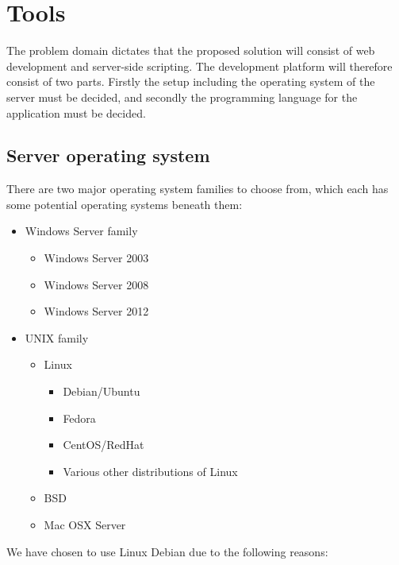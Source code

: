 \section{Tools}
The problem domain dictates that the proposed solution will consist of web development and server-side scripting.
The development platform will therefore consist of two parts.
Firstly the setup including the operating system of the server must be decided, and secondly the programming language for the application must be decided.

\subsection{Server operating system}
There are two major operating system families to choose from, which each has some potential operating systems beneath them:

\begin{itemize}
    \item Windows Server family
        \begin{itemize}
            \item Windows Server 2003
            \item Windows Server 2008
            \item Windows Server 2012
        \end{itemize}
    \item UNIX family
        \begin{itemize}
            \item Linux
                \begin{itemize}
                    \item Debian/Ubuntu
                    \item Fedora
                    \item CentOS/RedHat
                    \item Various other distributions of Linux
                \end{itemize}
            \item BSD
            \item Mac OSX Server
        \end{itemize}
\end{itemize}

We have chosen to use Linux Debian due to the following reasons:


